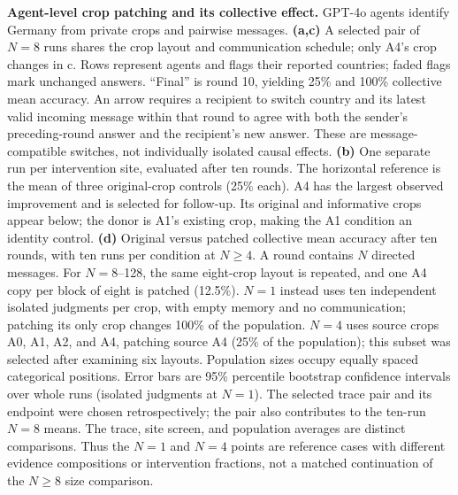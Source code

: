 \textbf{Agent-level crop patching and its collective effect.}
GPT-4o agents identify Germany from private crops and pairwise messages.
\textbf{(a,c)} A selected pair of \(N=8\) runs shares the crop layout and communication schedule; only A4's crop changes in c. Rows represent agents and flags their reported countries; faded flags mark unchanged answers. ``Final'' is round 10, yielding 25\% and 100\% collective mean accuracy. An arrow requires a recipient to switch country and its latest valid incoming message within that round to agree with both the sender's preceding-round answer and the recipient's new answer. These are message-compatible switches, not individually isolated causal effects.
\textbf{(b)} One separate run per intervention site, evaluated after ten rounds. The horizontal reference is the mean of three original-crop controls (25\% each). A4 has the largest observed improvement and is selected for follow-up. Its original and informative crops appear below; the donor is A1's existing crop, making the A1 condition an identity control.
\textbf{(d)} Original versus patched collective mean accuracy after ten rounds, with ten runs per condition at \(N\geq4\). A round contains \(N\) directed messages. For \(N=8\)--128, the same eight-crop layout is repeated, and one A4 copy per block of eight is patched (12.5\%). \(N=1\) instead uses ten independent isolated judgments per crop, with empty memory and no communication; patching its only crop changes 100\% of the population. \(N=4\) uses source crops A0, A1, A2, and A4, patching source A4 (25\% of the population); this subset was selected after examining six layouts. Population sizes occupy equally spaced categorical positions. Error bars are 95\% percentile bootstrap confidence intervals over whole runs (isolated judgments at \(N=1\)). The selected trace pair and its endpoint were chosen retrospectively; the pair also contributes to the ten-run \(N=8\) means. The trace, site screen, and population averages are distinct comparisons. Thus the \(N=1\) and \(N=4\) points are reference cases with different evidence compositions or intervention fractions, not a matched continuation of the \(N\geq8\) size comparison.

